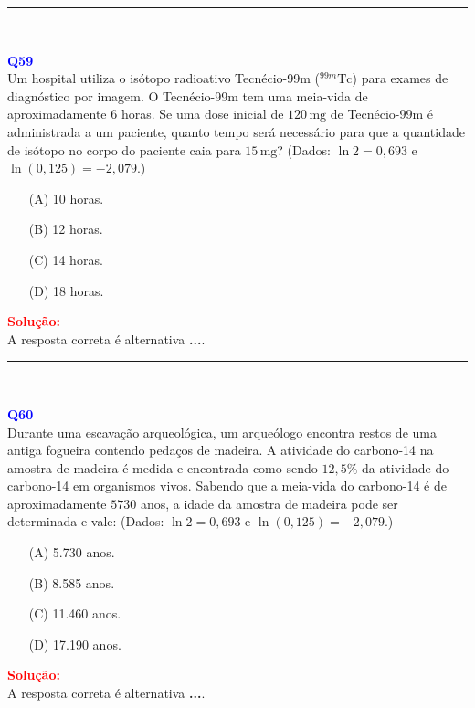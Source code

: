 \documentclass[a4paper,12pt]{article}
\begin{document}
\noindent\rule{\linewidth}{0.6pt}\\


\begin{flushleft}
\textbf{\textcolor{blue}{\Large Q59}}\\
\noindent
Um hospital utiliza o isótopo radioativo Tecnécio-99m (\(^{99m}\mathrm{Tc}\)) para exames de diagnóstico por imagem.  
O Tecnécio-99m tem uma meia-vida de aproximadamente \(6\) horas. Se uma dose inicial de \(120\,\mathrm{mg}\) de Tecnécio-99m é 
administrada a um paciente, quanto tempo será necessário para que a quantidade de isótopo no corpo do paciente caia para \(15\,\mathrm{mg}\)?
(Dados: \(\ln 2 = 0{,}693\) e \(\ln(0{,}125) = -2{,}079\).)

\begin{itemize}
\item[(A)] 10 horas.
\item[(B)] 12 horas.
\item[(C)] 14 horas.
\item[(D)] 18 horas.
\end{itemize}

\vspace{0.5cm}

\textcolor{red}{\textbf{Solução:}}\\

A resposta correta é alternativa \colorbox{green!50}{\textbf{...}}.
\end{flushleft}

\noindent\rule{\linewidth}{0.6pt}\\

\begin{flushleft}
\textbf{\textcolor{blue}{\Large Q60}}\\
\noindent
Durante uma escavação arqueológica, um arqueólogo encontra restos de uma antiga fogueira contendo pedaços de madeira.  
A atividade do carbono-14 na amostra de madeira é medida e encontrada como sendo \(12{,}5\%\) da atividade do carbono-14 em organismos vivos.  
Sabendo que a meia-vida do carbono-14 é de aproximadamente \(5730\) anos, a idade da amostra de madeira pode ser determinada e vale:  
(Dados: \(\ln 2 = 0{,}693\) e \(\ln(0{,}125) = -2{,}079\).)

\begin{itemize}
\item[(A)] 5.730 anos.
\item[(B)] 8.585 anos.
\item[(C)] 11.460 anos.
\item[(D)] 17.190 anos.
\end{itemize}

\vspace{0.5cm}

\textcolor{red}{\textbf{Solução:}}\\

A resposta correta é alternativa \colorbox{green!50}{\textbf{...}}.
\end{flushleft}
\end{document}
